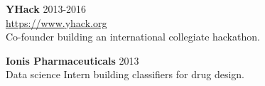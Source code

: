 \documentclass[margin, 10pt]{res} %
\begin{document}
\begin{resume}
\textbf{YHack} \hfill 2013-2016 \\
\url{https://www.yhack.org} \\
Co-founder building an international collegiate hackathon.

\textbf{Ionis Pharmaceuticals} \hfill 2013 \\
Data science Intern building classifiers for drug design.


\end{resume}
\end{document}
